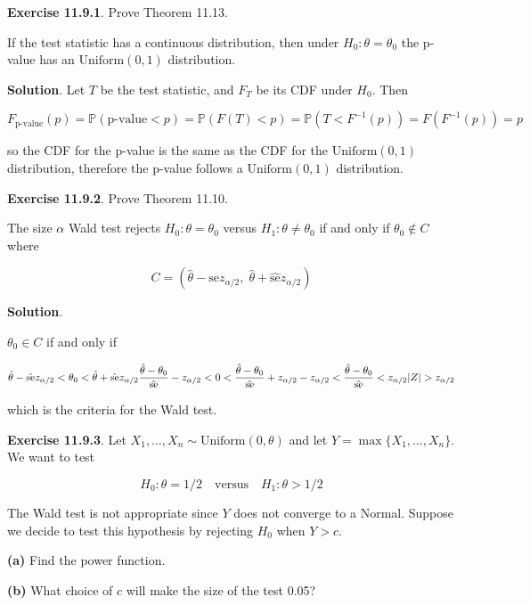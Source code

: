 \textbf{Exercise 11.9.1}. Prove Theorem 11.13.

If the test statistic has a continuous distribution, then under
\(H_0: \theta = \theta_0\) the p-value has an \(\text{Uniform}(0, 1)\)
distribution.

\textbf{Solution}. Let \(T\) be the test statistic, and \(F_T\) be its
CDF under \(H_0\). Then

\[ F_\text{p-value}(p) = \mathbb{P}(\text{p-value} < p) = \mathbb{P}(F(T) < p) = \mathbb{P}(T < F^{-1}(p)) = F(F^{-1}(p)) = p\]

so the CDF for the p-value is the same as the CDF for the
\(\text{Uniform}(0, 1)\) distribution, therefore the p-value follows a
\(\text{Uniform}(0, 1)\) distribution.

\textbf{Exercise 11.9.2}. Prove Theorem 11.10.

The size \(\alpha\) Wald test rejects \(H_0: \theta = \theta_0\) versus
\(H_1: \theta \neq \theta_0\) if and only if \(\theta_0 \notin C\) where

\[ C = \left(\hat{\theta} - \hat{\text{se}} z_{\alpha/2}, \; \hat{\theta} + \hat{\text{se}} z_{\alpha / 2} \right) \]

\textbf{Solution}.

\(\theta_0 \in C\) if and only if

\[
\hat{\theta} - \hat{\text{se}} z_{\alpha/2} < \theta_0 < \hat{\theta} + \hat{\text{se}} z_{\alpha/2} \\
\frac{\hat{\theta} - \theta_0}{\hat{\text{se}}} - z_{\alpha/2} < 0 < \frac{\hat{\theta} - \theta_0}{\hat{\text{se}}} +  z_{\alpha/2} \\
- z_{\alpha/2} < \frac{\hat{\theta} - \theta_0}{\hat{\text{se}}} < z_{\alpha/2} \\
|Z| > z_{\alpha/2}
\]

which is the criteria for the Wald test.

\textbf{Exercise 11.9.3}. Let
\(X_1, \dots, X_n \sim \text{Uniform}(0, \theta)\) and let
\(Y = \max \{ X_1, \dots, X_n \}\). We want to test

\[ H_0: \theta = 1/2 \quad \text{versus} \quad H_1: \theta > 1/2 \]

The Wald test is not appropriate since \(Y\) does not converge to a
Normal. Suppose we decide to test this hypothesis by rejecting \(H_0\)
when \(Y > c\).

\textbf{(a)} Find the power function.

\textbf{(b)} What choice of \(c\) will make the size of the test 0.05?

